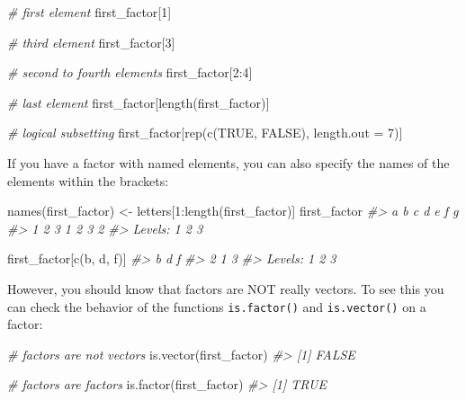 \documentclass[
]{book}
\newenvironment{Shaded}{\begin{snugshade}}{\end{snugshade}}
\newcommand{\AttributeTok}[1]{\textcolor[rgb]{0.77,0.63,0.00}{#1}}
\newcommand{\CommentTok}[1]{\textcolor[rgb]{0.56,0.35,0.01}{\textit{#1}}}
\newcommand{\ConstantTok}[1]{\textcolor[rgb]{0.00,0.00,0.00}{#1}}
\newcommand{\DecValTok}[1]{\textcolor[rgb]{0.00,0.00,0.81}{#1}}
\newcommand{\FunctionTok}[1]{\textcolor[rgb]{0.00,0.00,0.00}{#1}}
\newcommand{\NormalTok}[1]{#1}
\newcommand{\OtherTok}[1]{\textcolor[rgb]{0.56,0.35,0.01}{#1}}
\newcommand{\SpecialCharTok}[1]{\textcolor[rgb]{0.00,0.00,0.00}{#1}}
\newcommand{\StringTok}[1]{\textcolor[rgb]{0.31,0.60,0.02}{#1}}
\begin{document}
\begin{Shaded}
\begin{Highlighting}[]
\CommentTok{\# first element}
\NormalTok{first\_factor[}\DecValTok{1}\NormalTok{]}

\CommentTok{\# third element}
\NormalTok{first\_factor[}\DecValTok{3}\NormalTok{]}

\CommentTok{\# second to fourth elements}
\NormalTok{first\_factor[}\DecValTok{2}\SpecialCharTok{:}\DecValTok{4}\NormalTok{]}

\CommentTok{\# last element}
\NormalTok{first\_factor[}\FunctionTok{length}\NormalTok{(first\_factor)]}

\CommentTok{\# logical subsetting}
\NormalTok{first\_factor[}\FunctionTok{rep}\NormalTok{(}\FunctionTok{c}\NormalTok{(}\ConstantTok{TRUE}\NormalTok{, }\ConstantTok{FALSE}\NormalTok{), }\AttributeTok{length.out =} \DecValTok{7}\NormalTok{)]}
\end{Highlighting}
\end{Shaded}

If you have a factor with named elements, you can also specify the names of
the elements within the brackets:

\begin{Shaded}
\begin{Highlighting}[]
\FunctionTok{names}\NormalTok{(first\_factor) }\OtherTok{\textless{}{-}}\NormalTok{ letters[}\DecValTok{1}\SpecialCharTok{:}\FunctionTok{length}\NormalTok{(first\_factor)]}
\NormalTok{first\_factor}
\CommentTok{\#\textgreater{} a b c d e f g }
\CommentTok{\#\textgreater{} 1 2 3 1 2 3 2 }
\CommentTok{\#\textgreater{} Levels: 1 2 3}

\NormalTok{first\_factor[}\FunctionTok{c}\NormalTok{(}\StringTok{\textquotesingle{}b\textquotesingle{}}\NormalTok{, }\StringTok{\textquotesingle{}d\textquotesingle{}}\NormalTok{, }\StringTok{\textquotesingle{}f\textquotesingle{}}\NormalTok{)]}
\CommentTok{\#\textgreater{} b d f }
\CommentTok{\#\textgreater{} 2 1 3 }
\CommentTok{\#\textgreater{} Levels: 1 2 3}
\end{Highlighting}
\end{Shaded}

However, you should know that factors are NOT really vectors. To see this you
can check the behavior of the functions \texttt{is.factor()} and \texttt{is.vector()} on a
factor:

\begin{Shaded}
\begin{Highlighting}[]
\CommentTok{\# factors are not vectors}
\FunctionTok{is.vector}\NormalTok{(first\_factor)}
\CommentTok{\#\textgreater{} [1] FALSE}

\CommentTok{\# factors are factors}
\FunctionTok{is.factor}\NormalTok{(first\_factor)}
\CommentTok{\#\textgreater{} [1] TRUE}
\end{Highlighting}
\end{Shaded}
\end{document}
